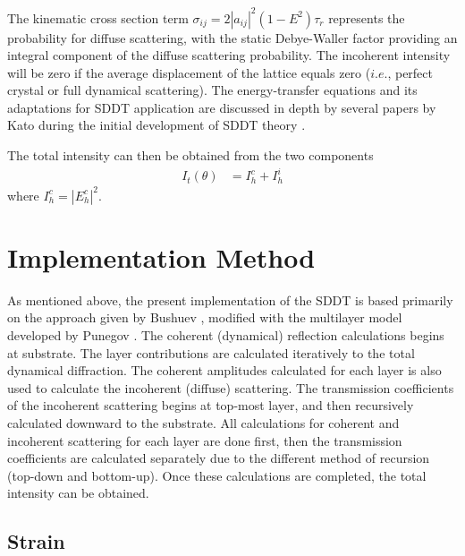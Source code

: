 The kinematic cross section term $\sigma_{ij}=2 |a_{ij}|^2(1-E^2)\tau_r$ represents the probability for diffuse scattering, with the static Debye-Waller factor providing an integral component of the diffuse scattering probability.  The incoherent intensity will be zero if the average displacement of the lattice equals zero ($i.e.$, perfect crystal or full dynamical scattering).  The energy-transfer equations and its adaptations for SDDT application are discussed in depth by several papers by Kato during the initial development of SDDT theory \cite{KatoI,KatoII,KatoIII,KatoIV,Kato2,Kato1}.

The total intensity can then be obtained from the two components \cite{Bushuev1}
\begin{align}
I_t(\theta)&=I_h^c + I_h^i
\end{align}
where $I_h^c = |E_h^c|^2$.

	\section{Implementation Method}

As mentioned above, the present implementation of the SDDT is based primarily on the approach given by Bushuev \cite{Bushuev1}, modified with the multilayer model developed by Punegov \cite{Punegov15,Punegov2}.  The coherent (dynamical) reflection calculations begins at substrate.  The layer contributions are calculated iteratively to the total dynamical diffraction.  The coherent amplitudes calculated for each layer is also used to calculate the incoherent (diffuse) scattering.  The transmission coefficients of the incoherent scattering begins at top-most layer, and then recursively calculated downward to the substrate. All calculations for coherent and incoherent scattering for each layer are done first, then the transmission coefficients are calculated separately due to the  different method of recursion (top-down and bottom-up).  Once these calculations are completed, the total intensity can be obtained.

		\subsection{Strain}

